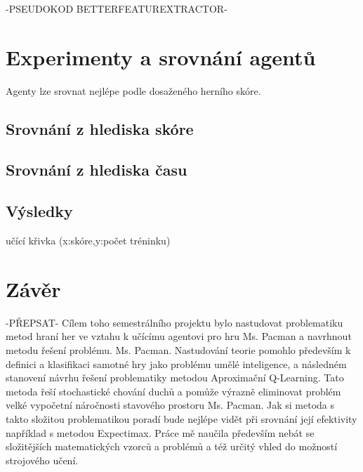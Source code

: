 -PSEUDOKOD BETTERFEATUREXTRACTOR-

\chapter{Experimenty a srovnání agentů}
\label{exper}
Agenty lze srovnat nejlépe podle dosaženého herního skóre.
\section{Srovnání z hlediska skóre}
\section{Srovnání z hlediska času}
\section{Výsledky}
učící křivka (x:skóre,y:počet tréninku)

\chapter{Závěr}
-PŘEPSAT-
Cílem toho semestrálního projektu bylo nastudovat problematiku metod hraní her ve vztahu k učícímu agentovi pro hru Ms. Pacman a navrhnout metodu řešení problému. Ms. Pacman. Nastudování teorie pomohlo především k definici a klasifikaci samotné hry jako problému umělé inteligence, a následném stanovení návrhu řešení problematiky metodou Aproximační Q-Learning. Tato metoda řeší stochastické chování duchů a pomůže výrazně eliminovat problém velké vypočetní náročnosti stavového prostoru Ms. Pacman. Jak si metoda s takto složitou problematikou poradí bude nejlépe vidět při srovnání její efektivity například s metodou Expectimax. Práce mě naučila především nebát se složitějších matematických vzorců a problémů a též určitý vhled do možností strojového učení.

